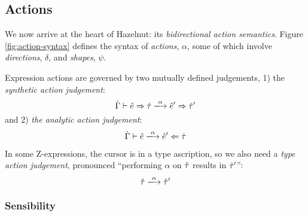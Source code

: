 \subsection{Actions}\label{sec:actions}


We now arrive at the heart of Hazelnut: its \emph{bidirectional action semantics}.  
Figure \ref{fig:action-syntax} defines the syntax of \emph{actions}, $\alpha$, some of which involve \emph{directions}, $\delta$, and \emph{shapes}, $\psi$. 

Expression actions are governed by two mutually defined judgements, 1) the \emph{synthetic action judgement}:
\[
\performSyn{\hGamma}{\zexp}{\htau}{\alpha}{\zexp'}{\htau'}
\]
and 2) \emph{the analytic action judgement}:
\[
\performAna{\hGamma}{\zexp}{\htau}{\alpha}{\zexp'}
\]

In some Z-expressions, the cursor is in a type ascription, so we also need a \emph{type action judgement}, pronounced ``performing $\alpha$ on $\hat{\tau}$ results in $\hat{\tau}'$'':
\[
\performTyp{\ztau}{\alpha}{\ztau'}
\]


\subsubsection{Sensibility}


